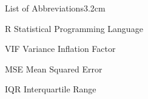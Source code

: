 \begin{mclistof}{List of Abbreviations}{3.2cm}

\item[R] Statistical Programming Language
\item[VIF] Variance Inflation Factor
\item[MSE] Mean Squared Error
\item[IQR] Interquartile Range

\end{mclistof} 
